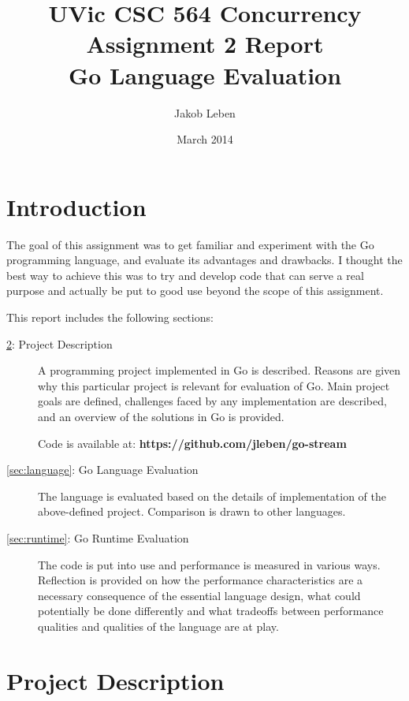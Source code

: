 \documentclass {article}
\begin{document}
\title{UVic CSC 564 Concurrency\\Assignment 2 Report\\Go Language Evaluation}
\author{Jakob Leben}
\date{March 2014}
\maketitle


\section{Introduction}

The goal of this assignment was to get familiar and experiment with the Go
programming language, and evaluate its advantages and drawbacks. I thought the
best way to achieve this was to try and develop code that can serve a real
purpose and actually be put to good use beyond the scope of this assignment.

This report includes the following sections:

\begin{description}

\item[\ref{sec:project}: Project Description] A programming project implemented
in Go is described. Reasons are given why this particular project is relevant
for evaluation of Go. Main project goals are defined, challenges faced by any
implementation are described, and an overview of the solutions in Go is
provided.

Code is available at: \textbf{https://github.com/jleben/go-stream}

\item[\ref{sec:language}: Go Language Evaluation] The language is evaluated
based on the details of implementation of the above-defined project. Comparison
is drawn to other languages.

\item[\ref{sec:runtime}: Go Runtime Evaluation] The code is put into use and
performance is measured in various ways. Reflection is provided on how the
performance characteristics are a necessary consequence of the essential
language design, what could potentially be done differently and what tradeoffs
between performance qualities and qualities of the language are at play.

\end{description}

\section{Project Description}
\label{sec:project}
\end{document}
